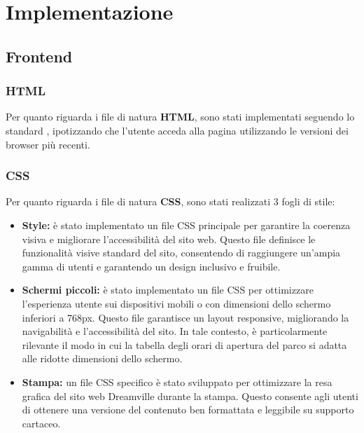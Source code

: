 \section{Implementazione}
\subsection{Frontend}
\subsubsection{HTML}
Per quanto riguarda i file di natura \textbf{HTML}, sono stati implementati seguendo lo standard , ipotizzando che l'utente acceda alla pagina utilizzando le versioni dei browser più recenti.

\subsubsection{CSS}
Per quanto riguarda i file di natura \textbf{CSS}, sono stati realizzati 3 fogli di stile:
\begin{itemize}
    \item \textbf{Style:} è stato implementato un file CSS principale per garantire la coerenza visiva e migliorare l'accessibilità del sito web. Questo file definisce le funzionalità visive standard del sito, consentendo di raggiungere un'ampia gamma di utenti e garantendo un design inclusivo e fruibile.
    \item \textbf{Schermi piccoli:} è stato implementato un file CSS per ottimizzare l'esperienza utente sui dispositivi mobili o con dimensioni dello schermo inferiori a 768px. Questo file garantisce un layout responsive, migliorando la navigabilità e l'accessibilità del sito. In tale contesto, è particolarmente rilevante il modo in cui la tabella degli orari di apertura del parco si adatta alle ridotte dimensioni dello schermo.
    \item \textbf{Stampa:} un file CSS specifico è stato sviluppato per ottimizzare la resa grafica del sito web Dreamville durante la stampa. Questo consente agli utenti di ottenere una versione del contenuto ben formattata e leggibile su supporto cartaceo.
\end{itemize}


